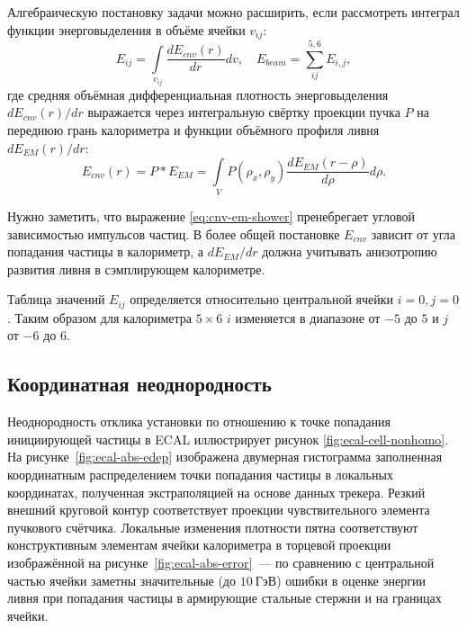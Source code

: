 Алгебраическую постановку задачи можно расширить, если рассмотреть
интеграл функции энерговыделения в объёме ячейки $v_{ij}$:
\begin{equation}
    E_{ij} =\int\limits_{v_{ij}} \frac{dE_{cnv} (r)}{d r} dv, \quad E_{beam} = \sum\limits_{ij}^{5,6} E_{i,j},
\end{equation}
где средняя объёмная дифференциальная плотность
энерговыделения $d E_{cnv}(r)/dr$ выражается через интегральную свёртку
проекции пучка $P$ на переднюю грань калориметра и функции объёмного
профиля ливня~$d E_{EM}(r)/dr$:
\begin{equation}
    E_{cnv}(r) = P * E_{EM}
        = \int\limits_{V} P(\rho_x,\rho_y) \frac{dE_{EM} (r -\rho)}{d \rho} d\rho.
    \label{eq:cnv-em-shower}
\end{equation}

Нужно заметить, что выражение \eqref{eq:cnv-em-shower} пренебрегает угловой
зависимостью импульсов частиц. В более общей постановке $E_{cnv}$
зависит от угла попадания частицы в калориметр, а $d E_{EM}/dr$ должна
учитывать анизотропию развития ливня в сэмплирующем калориметре.

Таблица значений $E_{ij}$ определяется относительно центральной
ячейки $i=0,j=0$. Таким образом для калориметра $5\times6$
$i$ изменяется в диапазоне от $-5$ до $5$ и $j$ от $-6$ до $6$.

\subsection{Координатная неоднородность}

Неоднородность отклика установки по отношению к точке попадания
инициирующей частицы в ECAL
иллюстрирует рисунок \ref{fig:ecal-cell-nonhomo}. На рисунке~\ref{fig:ecal-abs-edep}
изображена двумерная гистограмма заполненная координатным распределением
точки попадания частицы в локальных координатах, полученная экстраполяцией
на основе данных трекера. Резкий внешний круговой контур
соответствует проекции чувствительного элемента пучкового счётчика.
Локальные изменения плотности пятна соответствуют
конструктивным элементам ячейки калориметра в торцевой проекции изображённой
на рисунке~\ref{fig:ecal-abs-error}~--- по сравнению с центральной частью ячейки заметны значительные (до $10~\text{ГэВ}$) ошибки в оценке энергии ливня
при попадания частицы в армирующие стальные стержни
и на границах ячейки.


